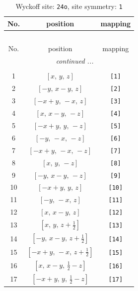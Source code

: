 \documentclass[fleqn,8pt]{jsarticle}
\begin{document}
\begin{longtable}{ccc}
\caption{Wyckoff site: {\tt 24o}, site symmetry: {\tt 1}}
 \\
 \hline \hline
No. & position & mapping \\ \hline \endfirsthead

\multicolumn{2}{l}{\tablename\ \thetable{}} \\
 \hline \hline
No. & position & mapping \\ \hline \endhead

 \hline \hline
\multicolumn{2}{r}{\footnotesize\it continued ...} \\ \endfoot

 \hline \hline
\multicolumn{2}{r}{} \\ \endlastfoot

1 & $\left[ x,\, y,\, z \right]$ & {\tt [1]} \\ \hline
2 & $\left[ - y,\, x - y,\, z \right]$ & {\tt [2]} \\ \hline
3 & $\left[ - x + y,\, - x,\, z \right]$ & {\tt [3]} \\ \hline
4 & $\left[ x,\, x - y,\, - z \right]$ & {\tt [4]} \\ \hline
5 & $\left[ - x + y,\, y,\, - z \right]$ & {\tt [5]} \\ \hline
6 & $\left[ - y,\, - x,\, - z \right]$ & {\tt [6]} \\ \hline
7 & $\left[ - x + y,\, - x,\, - z \right]$ & {\tt [7]} \\ \hline
8 & $\left[ x,\, y,\, - z \right]$ & {\tt [8]} \\ \hline
9 & $\left[ - y,\, x - y,\, - z \right]$ & {\tt [9]} \\ \hline
10 & $\left[ - x + y,\, y,\, z \right]$ & {\tt [10]} \\ \hline
11 & $\left[ - y,\, - x,\, z \right]$ & {\tt [11]} \\ \hline
12 & $\left[ x,\, x - y,\, z \right]$ & {\tt [12]} \\ \hline
13 & $\left[ x,\, y,\, z + \frac{1}{2} \right]$ & {\tt [13]} \\ \hline
14 & $\left[ - y,\, x - y,\, z + \frac{1}{2} \right]$ & {\tt [14]} \\ \hline
15 & $\left[ - x + y,\, - x,\, z + \frac{1}{2} \right]$ & {\tt [15]} \\ \hline
16 & $\left[ x,\, x - y,\, \frac{1}{2} - z \right]$ & {\tt [16]} \\ \hline
17 & $\left[ - x + y,\, y,\, \frac{1}{2} - z \right]$ & {\tt [17]} \\ \hline

\end{longtable}
\end{document}
